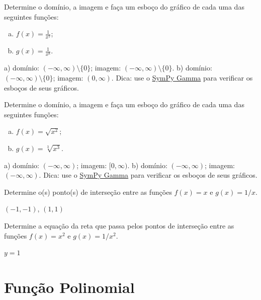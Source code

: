 \begin{exer}
  Determine o domínio, a imagem e faça um esboço do gráfico de cada uma das seguintes funções:
  \begin{enumerate}[a)]
  \item $\displaystyle f(x) = \frac{1}{x^7}$;
  \item $\displaystyle g(x) = \frac{1}{x^8}$.
  \end{enumerate}
\end{exer}
\begin{resp}
  a) domínio: $(-\infty, \infty)\setminus\{0\}$; imagem: $(-\infty, \infty)\setminus\{0\}$. b) domínio: $(-\infty, \infty)\setminus\{0\}$; imagem: $(0, \infty)$. Dica: use o \href{https://www.sympygamma.com/}{SymPy Gamma} para verificar os esboços de seus gráficos.
\end{resp}

\begin{exer}
  Determine o domínio, a imagem e faça um esboço do gráfico de cada uma das seguintes funções:
  \begin{enumerate}[a)]
  \item $\displaystyle f(x) = \sqrt{x^2}$;
  \item $\displaystyle g(x) = \sqrt[3]{x^3}$.
  \end{enumerate}
\end{exer}
\begin{resp}
  a) domínio: $(-\infty, \infty)$; imagem: $[0, \infty)$. b) domínio: $(-\infty, \infty)$; imagem: $(-\infty, \infty)$. Dica: use o \href{https://www.sympygamma.com/}{SymPy Gamma} para verificar os esboços de seus gráficos.
\end{resp}

\begin{exer}
  Determine o(s) ponto(s) de interseção entre as funções $f(x)=x$ e $g(x)=1/x$.
\end{exer}
\begin{resp}
  $(-1,-1)$, $(1,1)$
\end{resp}

\begin{exer}
  Determine a equação da reta que passa pelos pontos de interseção entre as funções $f(x)=x^2$ e $g(x)=1/x^2$.
\end{exer}
\begin{resp}
  $y=1$
\end{resp}


\section{Função Polinomial}\label{cap_funcao_sec_funpoli}

